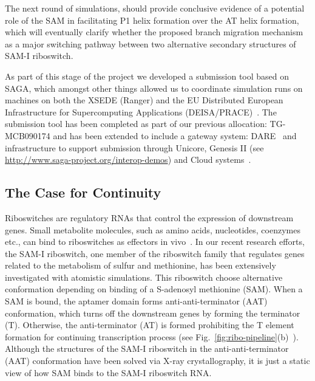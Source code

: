 \documentclass[a4paper,11pt]{article}
\newcommand{\yyenote}[1]{ {\textcolor{green} { ***YYE: #1 }}}
\newcommand{\yyenote}[1]{ {}}
\begin{document}
The next round of simulations, should provide conclusive evidence of a potential role of the SAM in facilitating P1 helix formation over the AT helix formation, which will eventually clarify whether the proposed branch migration mechanism as a major switching pathway between two alternative secondary structures of SAM-I riboswitch.

As part of this stage of the project we developed a submission tool based on SAGA, which amongst other things allowed us to coordinate simulation runs on machines on both the XSEDE (Ranger) and the EU Distributed European Infrastructure for Supercomputing Applications (DEISA/PRACE)~\cite{DEISA-PRACE}. The submission tool has been completed as part of our previous allocation: TG-MCB090174 and has been extended to include a gateway system: DARE~\cite{dare-tg11} and infrastructure to support submission through Unicore, Genesis II (see \url{http://www.saga-project.org/interop-demos}) and Cloud systems~\cite{pstar11}.



\subsection{The Case for Continuity}

Riboswitches are regulatory RNAs that control the expression of downstream genes. Small metabolite molecules, such as amino acids, nucleotides, coenzymes etc., can bind to riboswitches as effectors in vivo~\cite{mandal}.  In our recent research efforts, the SAM-I riboswitch, one member of the riboswitch family that regulates genes related to the metabolism of sulfur and methionine, has been extensively investigated with atomistic simulations.  This riboswitch choose alternative conformation depending on binding of a S-adenosyl methionine (SAM).  When a SAM is bound, the aptamer domain forms anti-anti-terminator (AAT) conformation, which turns off the downstream genes by forming the terminator (T). Otherwise, the anti-terminator (AT) is formed prohibiting the T element formation for continuing transcription process (see Fig.~\ref{fig:ribo-pipeline}(b)~\cite{brooke}).  Although the structures of the SAM-I riboswitch in the anti-anti-terminator (AAT) conformation have been solved via X-ray crystallography, it is just a static view of how SAM binds to the SAM-I riboswitch RNA.
\end{document}
